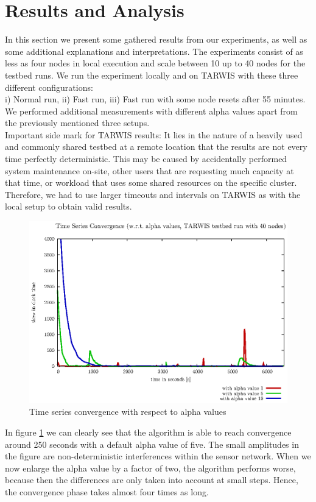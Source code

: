 \documentclass{llncs}
\begin{document}
\section{Results and Analysis}
In this section we present some gathered results from our experiments, as well as some additional explanations and interpretations. The experiments consist of as less as four nodes in local execution and scale between 10 up to 40 nodes for the testbed runs. We run the experiment locally and on TARWIS with these three different configurations:\\ i) Normal run, ii) Fast run, iii) Fast run with some node resets after 55 minutes.\\
We performed additional measurements with different alpha values apart from the previously mentioned three setups.\\
Important side mark for TARWIS results: It lies in the nature of a heavily used and commonly shared testbed at a remote location that the results are not every time perfectly deterministic. This may be caused by accidentally performed system maintenance on-site, other users that are requesting much capacity at that time, or workload that uses some shared resources on the specific cluster. Therefore, we had to use larger timeouts and intervals on TARWIS as with the local setup to obtain valid results.
\begin{figure}[H]
\centering
\includegraphics[scale=0.6]{images/FIG_01.eps}
\caption{Time series convergence with respect to alpha values}
\label{fig:alpha}
\end{figure}
\noindent In figure \ref{fig:alpha} we can clearly see that the algorithm is able to reach convergence around 250 seconds with a default alpha value of five. The small amplitudes in the figure are non-deterministic interferences within the sensor network. When we now enlarge the alpha value by a factor of two, the algorithm performs worse, because then the differences are only taken into account at small steps. Hence, the convergence phase takes almost four times as long.\\
\end{document}
